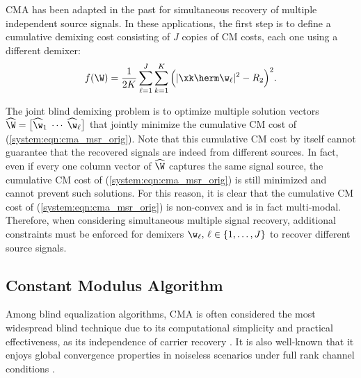 CMA has been adapted in the past for simultaneous recovery of multiple independent source signals. 
In these applications, the first step is to define a cumulative demixing cost consisting of $J$ copies of CM costs, each one using a different demixer:
\begin{equation}
	f(\W)=
	\displaystyle{\frac{1}{2K}\sum_{\ell=1}^J\sum_{k=1}^K\Big(|\xk\herm\w_{\ell}|^2-R_2\Big)^2}.
	\label{system:eqn:cma_msr_orig}
\end{equation}

The joint blind demixing problem is to optimize multiple solution vectors $\widehat\W=\big[\widehat{\w}_1\;\cdots\;\widehat{\w}_{\ell}\big]$ that jointly minimize the cumulative CM cost of (\ref{system:eqn:cma_msr_orig}). 
Note that this cumulative CM cost by itself cannot guarantee that the recovered signals are indeed from different sources. 
In fact, even if every one column vector of $\widehat \W$ captures the same signal source, the cumulative CM cost of (\ref{system:eqn:cma_msr_orig}) is still minimized and cannot prevent such solutions. 
For this reason, it is clear that the cumulative CM cost of (\ref{system:eqn:cma_msr_orig}) is non-convex and is in fact multi-modal. 
Therefore, when considering simultaneous multiple signal recovery, additional constraints must be enforced for demixers $\w_{\ell},\,\ell\in\{1,\ldots,J\}$ to recover different source signals. 






\subsection{Constant Modulus Algorithm}\label{system:ssec:cma}


Among blind equalization algorithms, CMA \cite{Godard1980cma} is often considered the most widespread blind technique due to its computational simplicity and practical effectiveness, as its independence of carrier recovery \cite{Ding2000}. It is also well-known that it enjoys global convergence properties in noiseless scenarios under full rank channel conditions \cite{LiDing1994cmaglobalconvergencefse}. 

